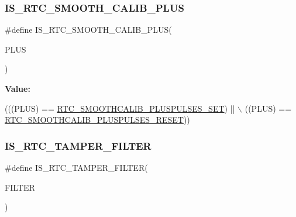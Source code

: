 \subsubsection{\texorpdfstring{I\+S\+\_\+\+R\+T\+C\+\_\+\+S\+M\+O\+O\+T\+H\+\_\+\+C\+A\+L\+I\+B\+\_\+\+P\+L\+US}{IS\_RTC\_SMOOTH\_CALIB\_PLUS}}
{\footnotesize\ttfamily \#define I\+S\+\_\+\+R\+T\+C\+\_\+\+S\+M\+O\+O\+T\+H\+\_\+\+C\+A\+L\+I\+B\+\_\+\+P\+L\+US(\begin{DoxyParamCaption}\item[{}]{P\+L\+US }\end{DoxyParamCaption})}

{\bfseries Value\+:}
\begin{DoxyCode}
(((PLUS) == \hyperlink{group___r_t_c_ex___smooth__calib___plus__pulses___definitions_ga53eabbf840a8631b955636bbfaf9bc83}{RTC\_SMOOTHCALIB\_PLUSPULSES\_SET}) || \(\backslash\)
                                        ((PLUS) == 
      \hyperlink{group___r_t_c_ex___smooth__calib___plus__pulses___definitions_gaed8a5d1a5400612bde6fe30b32f350e7}{RTC\_SMOOTHCALIB\_PLUSPULSES\_RESET}))
\end{DoxyCode}
\mbox{\label{group___r_t_c_ex___i_s___r_t_c___definitions_gaa695f102d84ff00aef2b7539f1293b00}} 
\subsubsection{\texorpdfstring{I\+S\+\_\+\+R\+T\+C\+\_\+\+T\+A\+M\+P\+E\+R\+\_\+\+F\+I\+L\+T\+ER}{IS\_RTC\_TAMPER\_FILTER}}
{\footnotesize\ttfamily \#define I\+S\+\_\+\+R\+T\+C\+\_\+\+T\+A\+M\+P\+E\+R\+\_\+\+F\+I\+L\+T\+ER(\begin{DoxyParamCaption}\item[{}]{F\+I\+L\+T\+ER }\end{DoxyParamCaption})}


